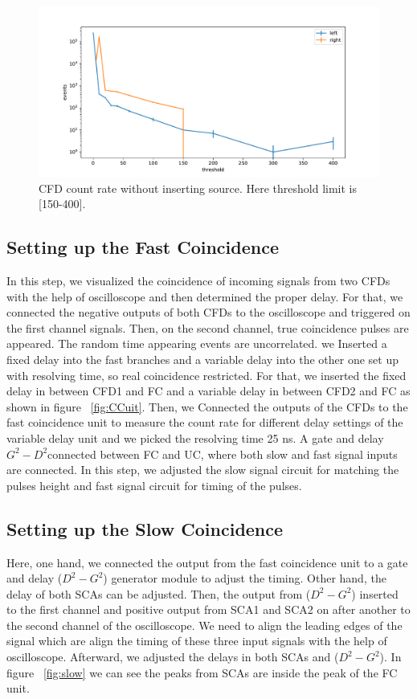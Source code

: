 \begin{figure}[ht]
	\centering
	\includegraphics[width=0.8\linewidth]{./figs/cfd2.pdf}
	\caption{CFD count rate without inserting source. Here threshold limit is [150-400].}%
	\label{fig:Cfd2}
\end{figure}

\subsection{Setting up the Fast Coincidence}
In this step, we visualized the coincidence of incoming signals from two CFDs with the help of oscilloscope and then determined the proper delay. For that, we connected the negative outputs of both CFDs to the oscilloscope and triggered on the first channel signals. Then, on the second channel, true coincidence pulses are  appeared. The random time appearing events are uncorrelated. we Inserted a fixed delay into the fast branches and a variable delay into the other one set up with resolving time, so real coincidence restricted. For that, we inserted the fixed delay in between CFD1 and FC and a variable delay in between CFD2 and FC as shown in figure ~\ref{fig:CCuit}. Then, we Connected the outputs of the CFDs to the fast coincidence unit to measure the count rate for different delay settings of the variable delay unit and we picked the resolving time 25 ns. A  gate and delay $ G^{2}-D^{2} $connected between FC and UC, where both slow and fast signal inputs are connected. In this step, we adjusted the slow signal circuit for matching the pulses height and fast signal circuit for timing of the pulses.


\subsection{Setting up the Slow Coincidence}

Here, one hand,  we connected the output from the fast coincidence unit to a gate and delay ($ D^{2}-G^{2} $) generator module to adjust the timing. Other hand, the delay of both SCAs can be adjusted. Then, the output from ($ D^{2}-G^{2} $) inserted to the first channel and positive output from SCA1 and SCA2 on after another to the second channel of the oscilloscope. We need to align the leading edges of the signal which are align the timing of these three input signals with the help of oscilloscope. Afterward, we adjusted the delays in both SCAs and ($ D^{2}-G^{2} $). In figure ~\ref{fig:slow} we can see the peaks from SCAs are inside the peak of the FC unit.


